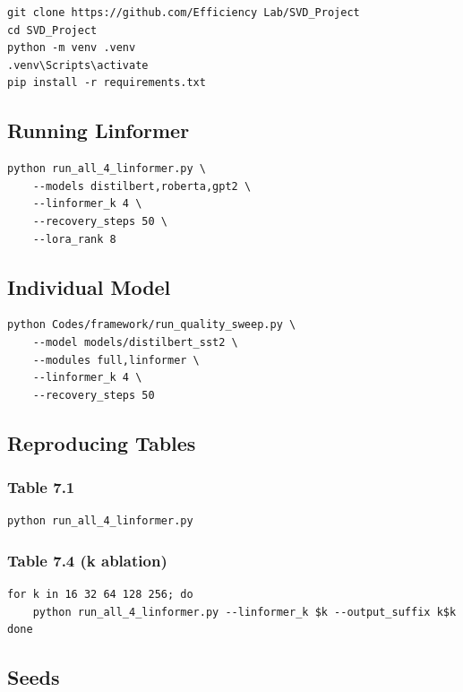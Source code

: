 \begin{lstlisting}
git clone https://github.com/Efficiency Lab/SVD_Project
cd SVD_Project
python -m venv .venv
.venv\Scripts\activate
pip install -r requirements.txt
\end{lstlisting}

\subsection{Running Linformer}

\begin{lstlisting}
python run_all_4_linformer.py \
    --models distilbert,roberta,gpt2 \
    --linformer_k 4 \
    --recovery_steps 50 \
    --lora_rank 8
\end{lstlisting}

\subsection{Individual Model}

\begin{lstlisting}
python Codes/framework/run_quality_sweep.py \
    --model models/distilbert_sst2 \
    --modules full,linformer \
    --linformer_k 4 \
    --recovery_steps 50
\end{lstlisting}

\subsection{Reproducing Tables}

\subsubsection{Table 7.1}
\begin{lstlisting}
python run_all_4_linformer.py
\end{lstlisting}

\subsubsection{Table 7.4 (k ablation)}
\begin{lstlisting}
for k in 16 32 64 128 256; do
    python run_all_4_linformer.py --linformer_k $k --output_suffix k$k
done
\end{lstlisting}

\subsection{Seeds}

